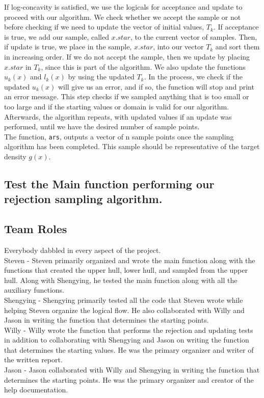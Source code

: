 \documentclass[12pt]{article}\usepackage[]{graphicx}\usepackage[]{color}
\begin{document}
If log-concavity is satisfied, we use the logicals for acceptance and update to proceed with our algorithm.  We check whether we accept the sample or not before checking if we need to update the vector of initial values, $T_k$.  If acceptance is true, we add our sample, called $x.star$, to the current vector of samples. Then, if update is true, we place in the sample, $x.star$, into our vector $T_k$ and sort them in increasing order. If we do not accept the sample, then we update by placing $x.star$ in $T_k$, since this is part of the algorithm.  We also update the functions $u_k(x)$ and $l_k(x)$ by using the updated $T_k$.  In the process, we check if the updated $u_k(x)$ will give us an error, and if so, the function will stop and print an error message.  This step checks if we sampled anything that is too small or too large and if the starting values or domain is valid for our algorithm.  Afterwards, the algorithm repeats, with updated values if an update was performed, until we have the desired number of sample points.\\

The function, \texttt{ars}, outputs a vector of n sample points once the sampling algorithm has been completed.  This sample should be representative of the target density $g(x)$.  


\subsection*{Test the Main function performing our rejection sampling algorithm.}

\subsection*{Team Roles}
Everybody dabbled in every aspect of the project.  \\

Steven - Steven primarily organized and wrote the main function along with the functions that created the upper hull, lower hull, and sampled from the upper hull.  Along with Shengying, he tested the main function along with all the auxiliary functions.  \\

Shengying - Shengying primarily tested all the code that Steven wrote while helping Steven organize the logical flow.  He also collaborated with Willy and Jason in writing the function that determines the starting points.\\

Willy - Willy wrote the function that performs the rejection and updating tests in addition to collaborating with Shengying and Jason on writing the function that determines the starting values.  He was the primary organizer and writer of the written report.\\

Jason - Jason collaborated with Willy and Shengying in writing the function that determines the starting points.  He was the primary organizer and creator of the help documentation.
\end{document}
